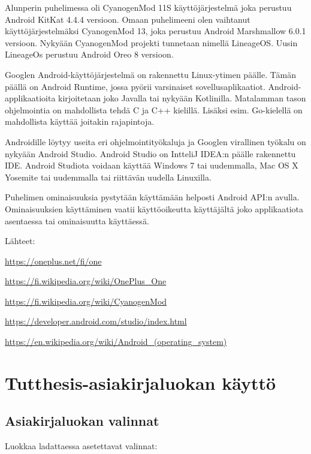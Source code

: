 \documentclass[globalnumbering,centeredcaptions]{tutthesis/tutthesis} %
\begin{document}
Alunperin puhelimessa oli CyanogenMod 11S käyttöjärjestelmä joka perustuu Android KitKat 4.4.4 versioon. Omaan puhelimeeni olen vaihtanut käyttöjärjestelmäksi CyanogenMod 13, joka perustuu Android Marshmallow 6.0.1 versioon. Nykyään CyanogenMod projekti tunnetaan nimellä LineageOS. Uusin LineageOs perustuu Android Oreo 8 versioon.

Googlen Android-käyttöjärjestelmä on rakennettu Linux-ytimen päälle. Tämän päällä on Android Runtime, jossa pyörii varsinaiset sovellusaplikaatiot. Android-applikaatioita kirjoitetaan joko Javalla tai nykyään Kotlinilla. Matalamman tason ohjelmointia on mahdollista tehdä C ja C++ kielillä. Lisäksi esim. Go-kielellä on mahdollista käyttää joitakin rajapintoja.

Androidille löytyy useita eri ohjelmointityökaluja ja Googlen virallinen työkalu on nykyään Android Studio. Android Studio on IntteliJ IDEA:n päälle rakennettu IDE. Android Studiota voidaan käyttää Windows 7 tai uudemmalla, Mac OS X Yosemite tai uudemmalla tai riittävän uudella Linuxilla.

Puhelimen ominaisuuksia pystytään käyttämään helposti Android API:n avulla. Ominaisuuksien käyttäminen vaatii käyttöoikeutta käyttäjältä joko applikaatiota asentaessa tai ominaisuutta käyttäessä.

Lähteet:

\url{https://oneplus.net/fi/one}

\url{https://fi.wikipedia.org/wiki/OnePlus_One}

\url{https://fi.wikipedia.org/wiki/CyanogenMod}

\url{https://developer.android.com/studio/index.html}

\url{https://en.wikipedia.org/wiki/Android_(operating_system)}

\iffalse

\chapter{Tutthesis-asiakirjaluokan käyttö}
\label{ch:classdocumentation}

\section{Asiakirjaluokan valinnat}

Luokkaa ladattaessa asetettavat valinnat:
\end{document}
